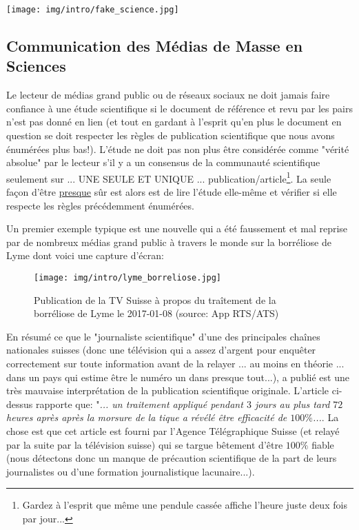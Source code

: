 	\begin{center}
		\texttt{[image: img/intro/fake\_science.jpg]}
	\end{center}

	\pagebreak
	\subsection{Communication des Médias de Masse en Sciences}
	Le lecteur de médias grand public ou de réseaux sociaux ne doit jamais faire confiance à une étude scientifique si le document de référence et revu par les pairs n'est pas donné en lien (et tout en gardant à l'esprit qu'en plus le document en question se doit respecter les règles de publication scientifique que nous avons énumérées plus bas!). L'étude ne doit pas non plus être considérée comme "vérité absolue" par le lecteur s'il y a un consensus de la communauté scientifique seulement sur ... UNE SEULE ET UNIQUE ... publication/article\footnote{Gardez à l'esprit que même une pendule cassée affiche l'heure juste deux fois par jour...}. La seule façon d'être \underline{presque} sûr est alors est de lire l'étude elle-même et vérifier si elle respecte les règles précédemment énumérées.

	Un premier exemple typique est une nouvelle qui a été faussement et mal reprise par de nombreux médias grand public à travers le monde sur la borréliose de Lyme dont voici une capture d'écran:
	\begin{figure}[H]
		\centering
		\texttt{[image: img/intro/lyme\_borreliose.jpg]}
		\caption[Publication de la Télévision Suisse sur le traîtement de la borréliose de Lyme]{Publication de la TV Suisse à propos du traîtement de la\\ borréliose de Lyme le 2017-01-08 (source: App RTS/ATS)}
	\end{figure}
	En résumé ce que le "journaliste scientifique" d'une des principales chaînes nationales suisses (donc une télévision qui a assez d'argent pour enquêter correctement sur toute information avant de la relayer ... au moins en théorie ... dans un pays qui estime être le numéro un dans presque tout...), a publié est une très mauvaise interprétation de la publication scientifique originale. L'article ci-dessus rapporte que: "\textit{... un traitement appliqué pendant $3$ jours au plus tard $72$ heures après après la morsure de la tique a révélé être efficacité de $100\%$...}. La chose est que cet article est fourni par l'Agence Télégraphique Suisse (et relayé par la suite par la télévision suisse) qui se targue bêtement d'être $100 \%$ fiable (nous détectons donc un manque de précaution scientifique de la part de leurs journalistes ou d'une formation journalistique lacunaire...).
	
